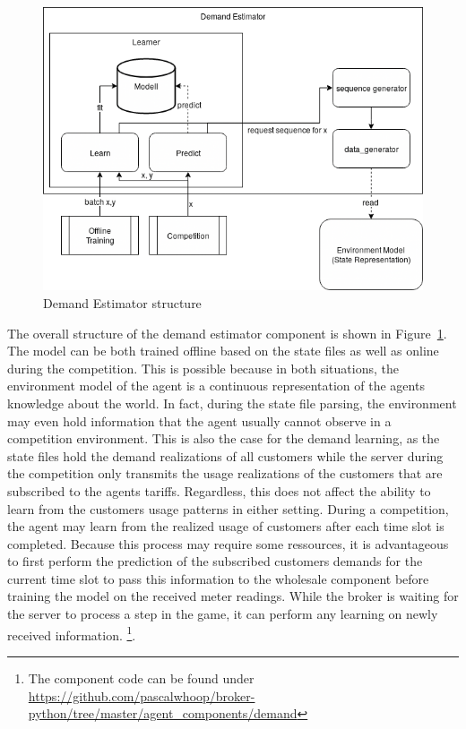 \begin{figure}[h] \centering \includegraphics[width=0.8\linewidth]{img/UsageEstimator.png} \caption{Demand Estimator
structure} \label{fig:DemandEstimator} \end{figure}


The overall structure of the demand estimator component is shown in Figure~\ref{fig:DemandEstimator}. The model can be
both trained offline based on the state files as well as online during the competition. This is possible because in both
situations, the environment model of the agent is a continuous representation of the agents knowledge about the world.
In fact, during the state file parsing, the environment may even hold information that the agent usually cannot observe
in a competition environment. This is also the case for the demand learning, as the state files hold the demand
realizations of all customers while the server during the competition only transmits the usage realizations of the
customers that are subscribed to the agents tariffs. Regardless, this does not affect the ability to learn from the
customers usage patterns in either setting. During a competition, the agent may learn from the realized usage of
customers after each time slot is completed. Because this process may require some ressources, it is advantageous to
first perform the prediction of the subscribed customers demands for the current time slot to pass this information to
the wholesale component before training the model on the received meter readings. While the broker is waiting for the
server to process a step in the game, it can perform any learning on newly received information. \footnote{The component code can be
found under \url{https://github.com/pascalwhoop/broker-python/tree/master/agent_components/demand}}.

